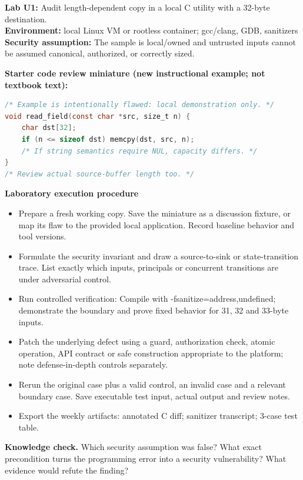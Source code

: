 \documentclass[10pt,letterpaper]{article}
\begin{document}
\begin{insight}\textbf{Lab U1:} Audit length-dependent copy in a local C utility with a 32-byte destination.\\\textbf{Environment:} local Linux VM or rootless container; gcc/clang, GDB, sanitizers\\\textbf{Security assumption:} The sample is local/owned and untrusted inputs cannot be assumed canonical, authorized, or correctly sized.\end{insight}
\textbf{Starter code review miniature (new instructional example; not textbook text):}
\begin{lstlisting}[language=C]
/* Example is intentionally flawed: local demonstration only. */
void read_field(const char *src, size_t n) {
    char dst[32];
    if (n <= sizeof dst) memcpy(dst, src, n);
    /* If string semantics require NUL, capacity differs. */
}
/* Review actual source-buffer length too. */
\end{lstlisting}
\textbf{Laboratory execution procedure}
\begin{itemize}[leftmargin=*,itemsep=2pt]
\item Prepare a fresh working copy. Save the miniature as a discussion fixture, or map its flaw to the provided local application. Record baseline behavior and tool versions.
\item Formulate the security invariant and draw a source-to-sink or state-transition trace. List exactly which inputs, principals or concurrent transitions are under adversarial control.
\item Run controlled verification: Compile with -fsanitize=address,undefined; demonstrate the boundary and prove fixed behavior for 31, 32 and 33-byte inputs.
\item Patch the underlying defect using a guard, authorization check, atomic operation, API contract or safe construction appropriate to the platform; note defense-in-depth controls separately.
\item Rerun the original case plus a valid control, an invalid case and a relevant boundary case. Save executable test input, actual output and review notes.
\item Export the weekly artifacts: annotated C diff; sanitizer transcript; 3-case test table.
\end{itemize}
\textbf{Knowledge check.} Which security assumption was false? What exact precondition turns the programming error into a security vulnerability? What evidence would refute the finding?
\end{document}
